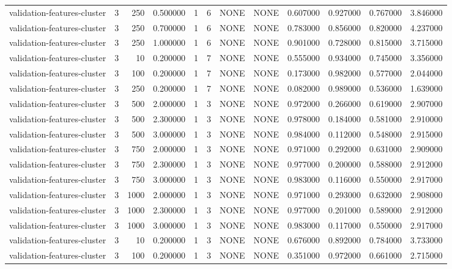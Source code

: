 \begin{tabular}{lrrrllllrrrr}
validation-features-cluster & 3 & 250 & 0.500000 & 1 & 6 & NONE & NONE & 0.607000 & 0.927000 & 0.767000 & 3.846000 \\
validation-features-cluster & 3 & 250 & 0.700000 & 1 & 6 & NONE & NONE & 0.783000 & 0.856000 & 0.820000 & 4.237000 \\
validation-features-cluster & 3 & 250 & 1.000000 & 1 & 6 & NONE & NONE & 0.901000 & 0.728000 & 0.815000 & 3.715000 \\
validation-features-cluster & 3 & 10 & 0.200000 & 1 & 7 & NONE & NONE & 0.555000 & 0.934000 & 0.745000 & 3.356000 \\
validation-features-cluster & 3 & 100 & 0.200000 & 1 & 7 & NONE & NONE & 0.173000 & 0.982000 & 0.577000 & 2.044000 \\
validation-features-cluster & 3 & 250 & 0.200000 & 1 & 7 & NONE & NONE & 0.082000 & 0.989000 & 0.536000 & 1.639000 \\
validation-features-cluster & 3 & 500 & 2.000000 & 1 & 3 & NONE & NONE & 0.972000 & 0.266000 & 0.619000 & 2.907000 \\
validation-features-cluster & 3 & 500 & 2.300000 & 1 & 3 & NONE & NONE & 0.978000 & 0.184000 & 0.581000 & 2.910000 \\
validation-features-cluster & 3 & 500 & 3.000000 & 1 & 3 & NONE & NONE & 0.984000 & 0.112000 & 0.548000 & 2.915000 \\
validation-features-cluster & 3 & 750 & 2.000000 & 1 & 3 & NONE & NONE & 0.971000 & 0.292000 & 0.631000 & 2.909000 \\
validation-features-cluster & 3 & 750 & 2.300000 & 1 & 3 & NONE & NONE & 0.977000 & 0.200000 & 0.588000 & 2.912000 \\
validation-features-cluster & 3 & 750 & 3.000000 & 1 & 3 & NONE & NONE & 0.983000 & 0.116000 & 0.550000 & 2.917000 \\
validation-features-cluster & 3 & 1000 & 2.000000 & 1 & 3 & NONE & NONE & 0.971000 & 0.293000 & 0.632000 & 2.908000 \\
validation-features-cluster & 3 & 1000 & 2.300000 & 1 & 3 & NONE & NONE & 0.977000 & 0.201000 & 0.589000 & 2.912000 \\
validation-features-cluster & 3 & 1000 & 3.000000 & 1 & 3 & NONE & NONE & 0.983000 & 0.117000 & 0.550000 & 2.917000 \\
validation-features-cluster & 3 & 10 & 0.200000 & 1 & 3 & NONE & NONE & 0.676000 & 0.892000 & 0.784000 & 3.733000 \\
validation-features-cluster & 3 & 100 & 0.200000 & 1 & 3 & NONE & NONE & 0.351000 & 0.972000 & 0.661000 & 2.715000 \\

\end{tabular}
